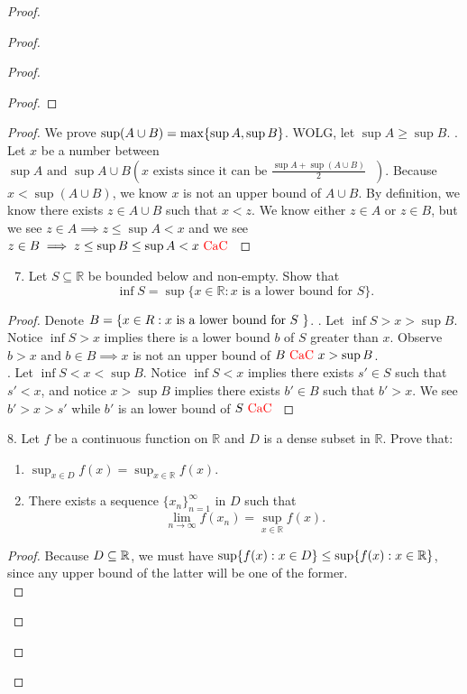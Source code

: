 \documentclass{report}
\begin{document}
\begin{proof}
\begin{proof}
\begin{proof}
\begin{proof}
\end{proof}
\begin{proof}
We prove $\sup (A\cup B)=\max \{ \sup A,\sup B \}$. WOLG, let $\sup A\geq \sup B$. . Let $x$ be a number between  $\sup A\text{ and }\sup A\cup B(x\text{ exists since it can be $\frac{\sup A+\sup (A\cup B)}{2}$ })$. Because $x<\sup (A\cup B)$, we know $x$ is not an upper bound of  $A\cup B$. By definition, we know there exists $z\in A\cup B$ such that $x<z$. We know either $z \in A$ or $z \in B$, but we see $z \in A\implies z\leq \sup A<x$ and we see $z \in B\implies z\leq \sup B\leq \sup A<x\text{ \textcolor{red}{CaC} }$
\end{proof}
\begin{question}{}{}
\begin{enumerate}
    \setcounter{enumi}{6}
    \item Let \( S \subseteq \mathbb{R} \) be bounded below and non-empty. Show that
    \[ \inf S = \sup\{ x \in \mathbb{R} : x \text{ is a lower bound for } S \}. \]
\end{enumerate}
\end{question}
\begin{proof}
Denote $B=\{ x\in R: x\text{ is a lower bound for $S$ } \}$. . Let $\inf S>x>\sup B$. Notice $\inf S>x$ implies there is a lower bound  $b$ of  $S$ greater than  $x$. Observe $b>x\text{ and }b \in B\implies x$ is not an upper bound of $B\text{ \textcolor{red}{CaC} } x>\sup B$.\\

. Let $\inf S<x<\sup B$. Notice $\inf S<x$ implies there exists $s' \in S$ such that $s'<x$, and notice $x> \sup B$ implies there exists $b'\in B$ such that $b'>x$. We see  $b'>x>s'$ while  $b'$ is an lower bound of  $S\text{ \textcolor{red}{CaC} }$
\end{proof}
\begin{question}{}{}
8. Let \( f \) be a continuous function on \( \mathbb{R} \) and \( D \) is a dense subset in \( \mathbb{R} \). Prove that:
\begin{enumerate}
    \item \( \sup_{x \in D} f(x) = \sup_{x \in \mathbb{R}} f(x) \).
    \item There exists a sequence \( \{x_n\}_{n=1}^{\infty} \) in \( D \) such that 
    \[
    \lim_{n \to \infty} f(x_n) = \sup_{x \in \mathbb{R}} f(x).
    \]
\end{enumerate}
\end{question}
\begin{proof}
Because $D\subseteq \mathbb{R}$, we must have $\sup \{ f(x): x\in D \}\leq \sup \{ f(x): x\in \mathbb{R} \}$, since any upper bound of the latter will be one of the former.\\


\end{proof}
\end{proof}
\end{proof}
\end{proof}
\end{document}
